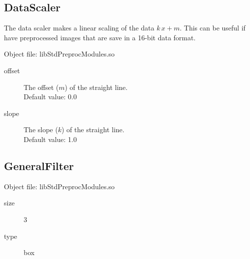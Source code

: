 \documentclass[a4paper]{scrreprt}
\begin{document}
\subsection{DataScaler}
The data scaler makes a linear scaling of the data $k\,x+m$. This can be useful
if have preprocessed images that are save in a 16-bit data format.

Object file: libStdPreprocModules.so
\begin{description}
 \item[offset] The offset ($m$) of the straight line. \\Default value: 0.0
 \item[slope] The slope ($k$) of the straight line. \\Default value: 1.0
\end{description}

\subsection{GeneralFilter}
Object file: libStdPreprocModules.so
\begin{description}
 \item[size]3
 \item[type]box
\end{description}
\end{document}
